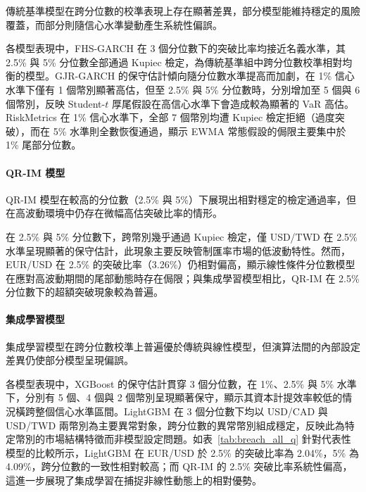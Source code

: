 傳統基準模型在跨分位數的校準表現上存在顯著差異，部分模型能維持穩定的風險覆蓋，而部分則隨信心水準變動產生系統性偏誤。

各模型表現中，FHS-GARCH 在 3 個分位數下的突破比率均接近名義水準，其 2.5\% 與 5\% 分位數全部通過 Kupiec 檢定，為傳統基準組中跨分位數校準相對均衡的模型。GJR-GARCH 的保守估計傾向隨分位數水準提高而加劇，在 1\% 信心水準下僅有 1 個幣別顯著高估，但至 2.5\% 與 5\% 分位數時，分別增加至 5 個與 6 個幣別，反映 Student-$t$ 厚尾假設在高信心水準下會造成較為顯著的 VaR 高估。RiskMetrics 在 1\% 信心水準下，全部 7 個幣別均遭 Kupiec 檢定拒絕（過度突破），而在 5\% 水準則全數恢復通過，顯示 EWMA 常態假設的侷限主要集中於 1\% 尾部分位數。

\paragraph{QR-IM 模型}

QR-IM 模型在較高的分位數（2.5\% 與 5\%）下展現出相對穩定的檢定通過率，但在高波動環境中仍存在微幅高估突破比率的情形。

在 2.5\% 與 5\% 分位數下，跨幣別幾乎通過 Kupiec 檢定，僅 USD/TWD 在 2.5\% 水準呈現顯著的保守估計，此現象主要反映管制匯率市場的低波動特性。然而，EUR/USD 在 2.5\% 的突破比率（3.26\%）仍相對偏高，顯示線性條件分位數模型在應對高波動期間的尾部動態時存在侷限；與集成學習模型相比，QR-IM 在 2.5\% 分位數下的超額突破現象較為普遍。

\paragraph{集成學習模型}

集成學習模型在跨分位數校準上普遍優於傳統與線性模型，但演算法間的內部設定差異仍使部分模型呈現偏誤。

各模型表現中，XGBoost 的保守估計貫穿 3 個分位數，在 1\%、2.5\% 與 5\% 水準下，分別有 5 個、4 個與 2 個幣別呈現顯著保守，顯示其資本計提效率較低的情況橫跨整個信心水準區間。LightGBM 在 3 個分位數下均以 USD/CAD 與 USD/TWD 兩幣別為主要異常對象，跨分位數的異常幣別組成穩定，反映此為特定幣別的市場結構特徵而非模型設定問題。如表~\ref{tab:breach_all_q} 針對代表性模型的比較所示，LightGBM 在 EUR/USD 於 2.5\% 的突破比率為 2.04\%，5\% 為 4.09\%，跨分位數的一致性相對較高；而 QR-IM 的 2.5\% 突破比率系統性偏高，這進一步展現了集成學習在捕捉非線性動態上的相對優勢。

